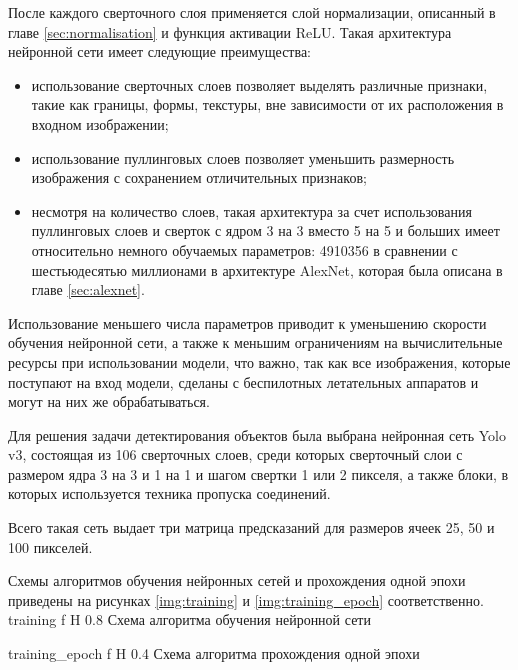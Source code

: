 После каждого сверточного слоя применяется слой нормализации, описанный в главе \ref{sec:normalisation} и функция активации ReLU. Такая архитектура нейронной сети имеет следующие преимущества:
\begin{itemize}
	\item использование сверточных слоев позволяет выделять различные признаки, такие как границы, формы, текстуры, вне зависимости от их расположения в входном изображении;
	\item использование пуллинговых слоев позволяет уменьшить размерность изображения с сохранением отличительных признаков;
	\item несмотря на количество слоев, такая архитектура за счет использования пуллинговых слоев и сверток с ядром 3 на 3 вместо 5 на 5 и больших имеет относительно немного обучаемых параметров: 4910356 в сравнении с шестьюдесятью миллионами в архитектуре AlexNet, которая была описана в главе \ref{sec:alexnet}.
\end{itemize}

Использование меньшего числа параметров приводит к уменьшению скорости обучения нейронной сети, а также к меньшим ограничениям на вычислительные ресурсы при использовании модели, что важно, так как все изображения, которые поступают на вход модели, сделаны с беспилотных летательных аппаратов и могут на них же обрабатываться.

Для решения задачи детектирования объектов была выбрана нейронная сеть Yolo v3, состоящая из 106 сверточных слоев, среди которых сверточный слои с размером ядра 3 на 3 и 1 на 1 и шагом свертки 1 или 2 пикселя, а также блоки, в которых используется техника пропуска соединений.

Всего такая сеть выдает три матрица предсказаний для размеров ячеек 25, 50 и 100 пикселей.

Схемы алгоритмов обучения нейронных сетей и прохождения одной эпохи приведены на рисунках \ref{img:training} и \ref{img:training_epoch} соответственно.
{training} %
{f} %
{H} %
{0.8\textwidth} %
{Схема алгоритма обучения нейронной сети} %

{training_epoch} %
{f} %
{H} %
{0.4\textwidth} %
{Схема алгоритма прохождения одной эпохи} %

